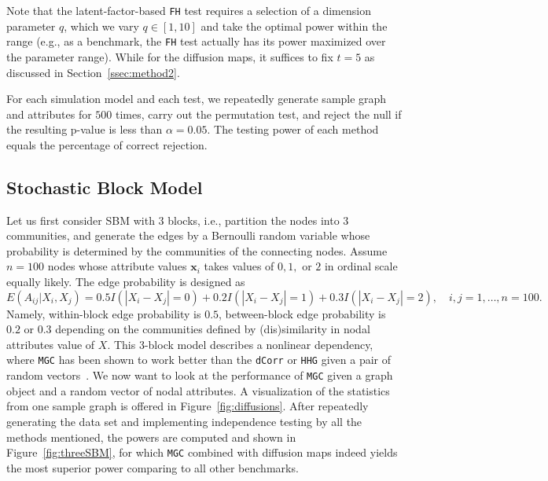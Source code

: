 \documentclass[11pt]{article}
\theoremstyle{definition}
\begin{document}
Note that the latent-factor-based \texttt{FH} test requires a selection of a dimension parameter $q$, which we vary $q \in [1,10]$ and take the optimal power within the range (e.g., as a benchmark, the \texttt{FH} test actually has its power maximized over the parameter range). While for the diffusion maps, it suffices to fix $t=5$ as discussed in Section~\ref{ssec:method2}.

For each simulation model and each test, we repeatedly generate sample graph and attributes for $500$ times, carry out the permutation test, and reject the null if the resulting p-value is less than $\alpha = 0.05$. The testing power of each method equals the percentage of correct rejection. 

\subsection{Stochastic Block Model}

Let us first consider SBM with $3$ blocks, i.e., partition the nodes into $3$ communities, and generate the edges by a Bernoulli random variable whose probability is determined by the communities of the connecting nodes. Assume $n=100$ nodes whose attribute values $\mathbf{x}_i$ takes values of $0,1,$ or $2$ in ordinal scale equally likely. The edge probability is designed as
\begin{equation}
\label{eq:Three}
E(A_{ij} | X_{i}, X_{j}) = 0.5 I(|X_{i} - X_{j}| = 0) + 0.2 I(|X_{i} - X_{j}| = 1) + 0.3 I(|X_{i} - X_{j}| = 2), \quad i,j = 1, \ldots, n = 100.
\end{equation} 
Namely, within-block edge probability is $0.5$, between-block edge probability is $0.2$ or $0.3$ depending on the communities defined by (dis)similarity in nodal attributes value of $X$. This 3-block model describes a nonlinear dependency, where \texttt{MGC} has been shown to work better than the \texttt{dCorr} or \texttt{HHG} given a pair of random vectors~\cite{shen2016discovering}. We now want to look at the performance of \texttt{MGC} given a graph object and a random vector of nodal attributes. A visualization of the statistics from one sample graph is offered in Figure~\ref{fig:diffusions}. After repeatedly generating the data set and implementing independence testing by all the methods mentioned, the powers are computed and shown in Figure~\ref{fig:threeSBM}, for which \texttt{MGC} combined with diffusion maps indeed yields the most superior power comparing to all other benchmarks.
\end{document}
